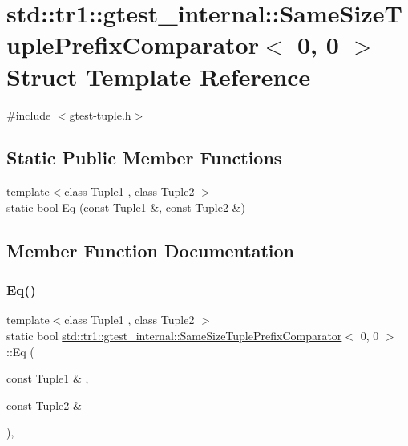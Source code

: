 \hypertarget{structstd_1_1tr1_1_1gtest__internal_1_1_same_size_tuple_prefix_comparator_3_010_00_010_01_4}{}\section{std\+:\+:tr1\+:\+:gtest\+\_\+internal\+:\+:Same\+Size\+Tuple\+Prefix\+Comparator$<$ 0, 0 $>$ Struct Template Reference}
\label{structstd_1_1tr1_1_1gtest__internal_1_1_same_size_tuple_prefix_comparator_3_010_00_010_01_4}


{\ttfamily \#include $<$gtest-\/tuple.\+h$>$}

\subsection*{Static Public Member Functions}
\begin{DoxyCompactItemize}
\item 
{\footnotesize template$<$class Tuple1 , class Tuple2 $>$ }\\static bool \hyperlink{structstd_1_1tr1_1_1gtest__internal_1_1_same_size_tuple_prefix_comparator_3_010_00_010_01_4_a4f209822266c6bb1832c49750a11ef95}{Eq} (const Tuple1 \&, const Tuple2 \&)
\end{DoxyCompactItemize}


\subsection{Member Function Documentation}
\mbox{\label{structstd_1_1tr1_1_1gtest__internal_1_1_same_size_tuple_prefix_comparator_3_010_00_010_01_4_a4f209822266c6bb1832c49750a11ef95}} 
\subsubsection{\texorpdfstring{Eq()}{Eq()}}
{\footnotesize\ttfamily template$<$class Tuple1 , class Tuple2 $>$ \\
static bool \hyperlink{structstd_1_1tr1_1_1gtest__internal_1_1_same_size_tuple_prefix_comparator}{std\+::tr1\+::gtest\+\_\+internal\+::\+Same\+Size\+Tuple\+Prefix\+Comparator}$<$ 0, 0 $>$\+::Eq (\begin{DoxyParamCaption}\item[{const Tuple1 \&}]{,  }\item[{const Tuple2 \&}]{ }\end{DoxyParamCaption})\hspace{0.3cm}{\ttfamily [inline]}, {\ttfamily [static]}}



